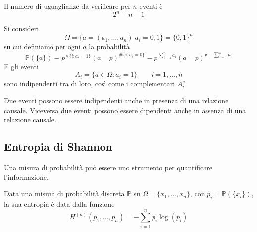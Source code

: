 \begin{observation}[Complessità]
	Il numero di uguaglianze da verificare per $n$ eventi è
	\begin{equation*}
		2^n -n -1
	\end{equation*}
\end{observation}

\begin{proposition}
	Si consideri
	\begin{equation*}
		\Omega = \{a=(a_1, \ldots, a_n) \vert a_i = 0,1\} = \{0, 1\}^n
	\end{equation*}
	su cui definiamo per ogni $a$ la probabilità
	\begin{equation*}
		\mathbb{P}(\{a\}) = p^ {\# \{i:a_i = 1\}} (a-p)^{\# \{i:a_i = 0\}} = p^{\sum_{i=1}^{n}a_i}(a-p)^{n-\sum_{i=1}^{n} a_i}
	\end{equation*}
	E gli eventi
	\begin{equation*}
		A_i = \{a \in \Omega: a_i = 1\} \quad\quad i = 1, \ldots, n
	\end{equation*}
	sono indipendenti tra di loro, così come i complementari $A^c_i$.
\end{proposition}

\begin{observation}
	Due eventi possono essere indipendenti anche in presenza di una relazione causale. Viceversa due eventi possono essere dipendenti anche in assenza di una relazione causale.
\end{observation}

\subsection{Entropia di Shannon}
Una misura di probabilità può essere uno strumento per quantificare l'informazione.
\begin{definition}[Entropia]
	Data una misura di probabilità discreta $\mathbb{P}$ su $\Omega = \{x_1, \ldots, x_n\}$, con $p_i = \mathbb{P}(\{x_i\})$, la sua entropia è data dalla funzione
	\begin{equation}
		H^{(n)}(p_1, \ldots, p_n) = - \sum_{i=1}^{n}p_i \log(p_i)
	\end{equation}
\end{definition}

